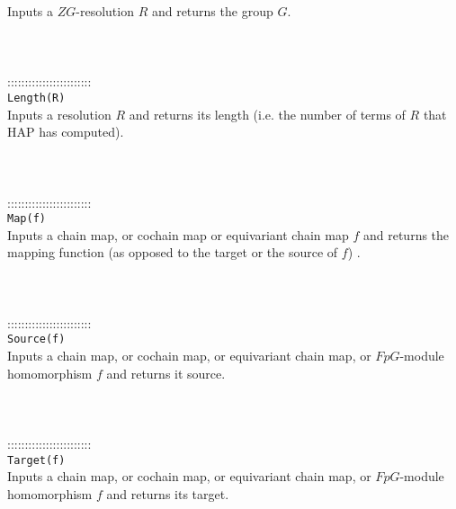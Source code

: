 \documentclass[a4paper,11pt]{report}
\begin{document}
{ Inputs a $ZG$-resolution $R$ and returns the group $G$. \\
 \\
 \\
 \\
 ::::::::::::::::::::::::\\
 \texttt{Length(R)}\\
 

 Inputs a resolution $R$ and returns its length (i.e. the number of terms of $R$ that HAP has computed). \\
 \\
 \\
 \\
 ::::::::::::::::::::::::\\
 \texttt{Map(f)}\\
 

 Inputs a chain map, or cochain map or equivariant chain map $f$ and returns the mapping function (as opposed to the target or the source of $f$) . \\
 \\
 \\
 \\
 ::::::::::::::::::::::::\\
 \texttt{Source(f)}\\
 

 Inputs a chain map, or cochain map, or equivariant chain map, or $FpG$-module homomorphism $f$ and returns it source. \\
 \\
 \\
 \\
 ::::::::::::::::::::::::\\
 \texttt{Target(f)}\\
 

 Inputs a chain map, or cochain map, or equivariant chain map, or $FpG$-module homomorphism $f$ and returns its target. \\
 \\
 \\
 }

 
\end{document}
